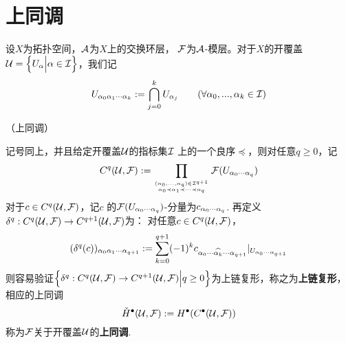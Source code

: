 

\section{\Cech 上同调}

设$X$为拓扑空间，$\mathcal{A}$为$X$上的交换环层，
$\mathcal{F}$为$\mathcal{A}$-模层。对于$X$的开覆盖
$\mathcal{U}=\Big\{ U_\alpha \Big| \alpha\in\mathcal{I} \Big\}$，我们记
$$
  U_{\alpha_0\alpha_1\cdots\alpha_k}
:=
  \bigcap_{j=0}^k
    U_{\alpha_j}
\qquad
(\forall \alpha_0,...,\alpha_k\in\mathcal{I})
$$


\begin{definition}（\Cech 上同调）

记号同上，并且给定开覆盖$\mathcal{U}$的指标集$\mathcal{I}$
上的一个良序$\preceq$，则对任意$q\geq 0$，记
$$
  C^q(\mathcal{U},\mathcal{F})
:=
  \prod_{(\alpha_0,...,\alpha_q)\in\mathcal{I}^{q+1}
         \atop \alpha_0\prec\alpha_1\prec\cdots\prec\alpha_q
        }
    \mathcal{F}(U_{\alpha_0\cdots\alpha_q})
$$
对于$c\in C^q(\mathcal{U},\mathcal{F})$，记$c$
的$\mathcal{F}(U_{\alpha_0\cdots\alpha_q})$-分量为$c_{\alpha_0\cdots\alpha_q}$.
再定义$\delta^q:C^q(\mathcal{U},\mathcal{F})\to C^{q+1}(\mathcal{U},\mathcal{F})$为：
对任意$c\in C^q(\mathcal{U},\mathcal{F})$，
$$
  (\delta^q(c))_{\alpha_0\alpha_1\cdots\alpha_{q+1}}
:=
  \sum_{k=0}^{q+1}
    (-1)^k
    c_{\alpha_0\cdots\widehat{\alpha_k}\cdots\alpha_{q+1}}
    |_{U_{\alpha_0\cdots\alpha_{q+1}}}
$$
则容易验证$\Big\{ \delta^q:C^q(\mathcal{U},\mathcal{F})\to C^{q+1}(\mathcal{U},\mathcal{F}) \Big| q\geq 0 \Big\}$为上链复形，称之为\textbf{\Cech 上链复形}，
相应的上同调
$$
  \check{H}^{\bullet}(\mathcal{U},\mathcal{F})
:=H^{\bullet}(C^{\bullet}(\mathcal{U},\mathcal{F}))
$$
称为$\mathcal{F}$关于开覆盖$\mathcal{U}$的\textbf{\Cech 上同调}.
\end{definition}

